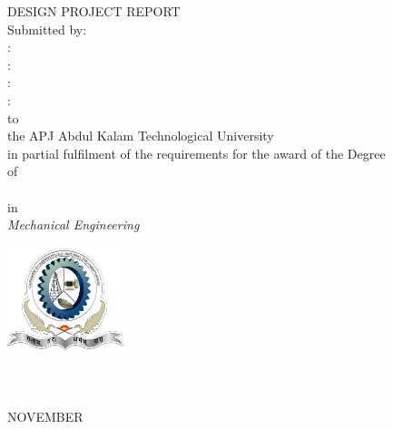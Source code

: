 \begin{titlepage}\onehalfspacing

\begin{center} 
\begin{minipage}[c][2.0in][c]{\textwidth} \bfseries\Large\centering
	\TITL
\end{minipage}

{DESIGN PROJECT REPORT}\\ %

\vspace{0.25in}
{Submitted by:}\\\vspace{4mm}
{\large \textbf{\STONE}}: \textbf{\RNONE} \\
{\large \textbf{\STTWO}}: \textbf{\RNTWO} \\
{\large \textbf{\STTHREE}}: \textbf{\RNTHREE} \\
{\large \textbf{\STFOUR}}: \textbf{\RNFOUR} \\
to \\
{the APJ Abdul Kalam Technological University}\\  {in partial fulfilment of the requirements for the award of the Degree}\\
{\normalsize{of}}\\
\\in\\ \textit{Mechanical Engineering}\\

\vspace{.2in}
\begin{center}
\includegraphics[height=1.25in]{./picture-files/vlogo.png}
\end{center}
\vspace{0mm}\doublespacing
\large {\bfseries {\DEPT}}\\ \vspace{1mm}
{\bfseries\large \BH}\\
NOVEMBER \yer
\end{center}
\end{titlepage}
